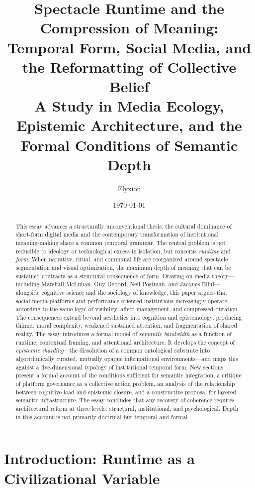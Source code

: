 \documentclass[12pt]{article}
\title{\textbf{Spectacle Runtime and the Compression of Meaning:\\
Temporal Form, Social Media, and the Reformatting of Collective Belief}\\[0.5em]
\large A Study in Media Ecology, Epistemic Architecture, and the Formal Conditions of Semantic Depth}
\author{Flyxion}
\date{\today}
\theoremstyle{definition}
\theoremstyle{plain}
\begin{document}
\maketitle

\begin{abstract}
This essay advances a structurally unconventional thesis: the cultural dominance of short-form digital media and the contemporary transformation of institutional meaning-making share a common temporal grammar. The central problem is not reducible to ideology or technological excess in isolation, but concerns \emph{runtime} and \emph{form}. When narrative, ritual, and communal life are reorganized around spectacle segmentation and visual optimization, the maximum depth of meaning that can be sustained contracts as a structural consequence of form. Drawing on media theory---including Marshall McLuhan, Guy Debord, Neil Postman, and Jacques Ellul---alongside cognitive science and the sociology of knowledge, this paper argues that social media platforms and performance-oriented institutions increasingly operate according to the same logic of visibility, affect management, and compressed duration. The consequences extend beyond aesthetics into cognition and epistemology, producing thinner moral complexity, weakened sustained attention, and fragmentation of shared reality. The essay introduces a formal model of \emph{semantic bandwidth} as a function of runtime, contextual framing, and attentional architecture. It develops the concept of \emph{epistemic sharding}---the dissolution of a common ontological substrate into algorithmically curated, mutually opaque informational environments---and maps this against a five-dimensional typology of institutional temporal form. New sections present a formal account of the conditions sufficient for semantic integration, a critique of platform governance as a collective action problem, an analysis of the relationship between cognitive load and epistemic closure, and a constructive proposal for layered semantic infrastructure. The essay concludes that any recovery of coherence requires architectural reform at three levels: structural, institutional, and psychological. Depth in this account is not primarily doctrinal but temporal and formal.
\end{abstract}

\newpage
\tableofcontents
\newpage

\section{Introduction: Runtime as a Civilizational Variable}
\end{document}
